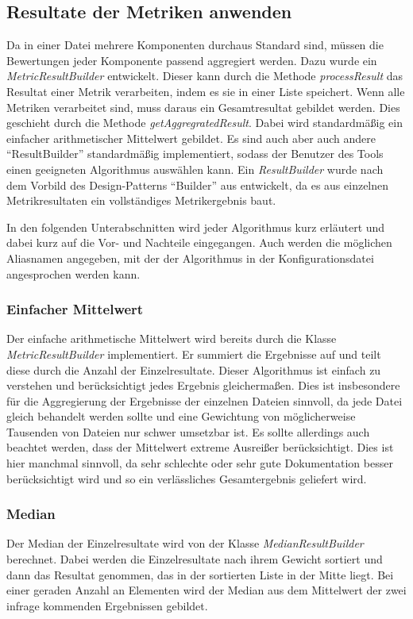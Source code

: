 \subsection{Resultate der Metriken anwenden}
Da in einer Datei mehrere Komponenten durchaus Standard sind, müssen die Bewertungen jeder Komponente passend aggregiert werden. Dazu wurde ein \textit{MetricResultBuilder} entwickelt. Dieser kann durch die Methode \textit{processResult} das Resultat einer Metrik verarbeiten, indem es sie in einer Liste speichert. Wenn alle Metriken verarbeitet sind, muss daraus ein Gesamtresultat gebildet werden. Dies geschieht durch die Methode \textit{getAggregratedResult}. Dabei wird standardmäßig ein einfacher arithmetischer Mittelwert gebildet. Es sind auch aber auch andere \enquote{ResultBuilder} standardmäßig implementiert, sodass der Benutzer des Tools einen geeigneten Algorithmus auswählen kann. Ein \textit{ResultBuilder} wurde nach dem Vorbild des Design-Patterns \enquote{Builder} aus \cite[S.139-149]{gamma2015design} entwickelt, da es aus einzelnen Metrikresultaten ein vollständiges Metrikergebnis baut. 

In den folgenden Unterabschnitten wird jeder Algorithmus kurz erläutert und dabei kurz auf die Vor- und Nachteile eingegangen. Auch werden die möglichen Aliasnamen angegeben, mit der der Algorithmus in der Konfigurationsdatei angesprochen werden kann. 

\subsubsection{Einfacher Mittelwert}
Der einfache arithmetische Mittelwert wird bereits durch die Klasse \textit{MetricResultBuilder} implementiert. Er summiert die Ergebnisse auf und teilt diese durch die Anzahl der Einzelresultate. Dieser Algorithmus ist einfach zu verstehen und berücksichtigt jedes Ergebnis gleichermaßen. Dies ist insbesondere für die Aggregierung der Ergebnisse der einzelnen Dateien sinnvoll, da jede Datei gleich behandelt werden sollte und eine Gewichtung von möglicherweise Tausenden von Dateien nur schwer umsetzbar ist. Es sollte allerdings auch beachtet werden, dass der Mittelwert extreme Ausreißer berücksichtigt. Dies ist hier manchmal sinnvoll, da sehr schlechte oder sehr gute Dokumentation besser berücksichtigt wird und so ein verlässliches Gesamtergebnis geliefert wird.


\subsubsection{Median}
Der Median der Einzelresultate wird von der Klasse \textit{MedianResultBuilder} berechnet. Dabei werden die Einzelresultate nach ihrem Gewicht sortiert und dann das Resultat genommen, das in der sortierten Liste in der Mitte liegt. Bei einer geraden Anzahl an Elementen wird der Median aus dem Mittelwert der zwei infrage kommenden Ergebnissen gebildet. 


